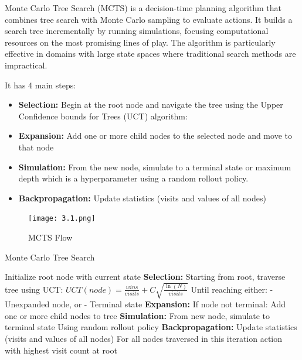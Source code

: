 \documentclass{article}
\begin{document}
Monte Carlo Tree Search (MCTS) is a decision-time planning algorithm that combines tree search with Monte Carlo sampling to evaluate actions. 
It builds a search tree incrementally by running simulations, focusing computational resources on the most promising lines of play. 
The algorithm is particularly effective in domains with large state spaces where traditional search methods are impractical.

It has 4 main steps:
\begin{itemize}
    \item \textbf{Selection:} Begin at the root node and navigate the tree using the Upper Confidence bounds for Trees (UCT) algorithm:
    \item \textbf{Expansion:} Add one or more child nodes to the selected node and move to that node
    \item \textbf{Simulation:} From the new node, simulate to a terminal state or maximum depth which is a hyperparameter using a random rollout policy.
    \item \textbf{Backpropagation:} Update statistics (visits and values of all nodes)
\end{itemize}
\begin{figure}
    \centering
    \texttt{[image: 3.1.png]}
    \caption{MCTS Flow}
    \label{fig:3.1}
\end{figure}
\begin{algorithm}
\caption{Monte Carlo Tree Search}
\begin{algorithmic}[1]
\State Initialize root node with current state
    \State \textbf{Selection:}
    \State \hspace{\algorithmicindent} Starting from root, traverse tree using UCT:
    \State \hspace{\algorithmicindent} $UCT(node) = \frac{wins}{visits} + C\sqrt{\frac{\ln(N)}{visits}}$
    \State \hspace{\algorithmicindent} Until reaching either:
    \State \hspace{\algorithmicindent} - Unexpanded node, or
    \State \hspace{\algorithmicindent} - Terminal state
    \State \textbf{Expansion:}
    \State \hspace{\algorithmicindent} If node not terminal:
    \State \hspace{\algorithmicindent} Add one or more child nodes to tree
    \State \textbf{Simulation:}
    \State \hspace{\algorithmicindent} From new node, simulate to terminal state
    \State \hspace{\algorithmicindent} Using random rollout policy
    \State \textbf{Backpropagation:}
    \State \hspace{\algorithmicindent} Update statistics (visits and values of all nodes)
    \State \hspace{\algorithmicindent} For all nodes traversed in this iteration
\EndWhile
\State \Return action with highest visit count at root
\end{algorithmic}
\label{alg:mcts}
\end{algorithm}
\end{document}
